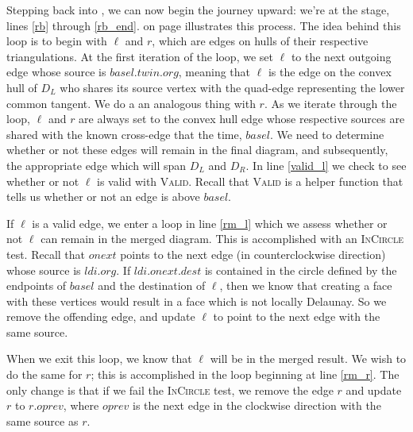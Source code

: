 \documentclass[12pt,twoside]{reedthesis}
\begin{document}
    Stepping back into , we can now begin the journey upward: we're at the  stage, lines \ref{rb} through \ref{rb_end}.  on page \pageref{fig:del_knit_all} illustrates this process. The idea behind this loop is to begin with $\ell$ and $r$, which are edges on hulls of their respective triangulations. At the first iteration of the loop, we set $\ell$ to the next outgoing edge whose source is $basel.twin.org$, meaning that $\ell$ is the edge on the convex hull of $D_{L}$ who shares its source vertex with the quad-edge representing the lower common tangent. We do a an analogous thing with $r$. As we iterate through the loop, $\ell$ and $r$ are always set to the convex hull edge whose respective sources are shared with the  known cross-edge that the time, $basel$. We need to determine whether or not these edges will remain in the final diagram, and subsequently, the appropriate edge which will span $D_{L}$ and $D_{R}$. In line \ref{valid_l} we check to see whether or not $\ell$ is valid with \textsc{Valid}. Recall that \textsc{Valid} is a helper function that tells us whether or not an edge is above $basel$. 

    If $\ell$ is a valid edge, we enter a loop in line \ref{rm_l} which we assess whether or not $\ell$ can remain in the merged diagram. This is accomplished with an \textsc{InCircle} test. Recall that $onext$ points to the next edge (in counterclockwise direction) whose source is $ldi.org$. If $ldi.onext.dest$ is contained in the circle defined by the endpoints of $basel$ and the destination of $\ell$, then we know that creating a face with these vertices would result in a face which is not locally Delaunay. So we remove the offending edge, and update $\ell$ to point to the next edge with the same source.\par

    When we exit this loop, we know that $\ell$ will be in the merged result. We wish to do the same for $r$; this is accomplished in the loop beginning at line \ref{rm_r}. The only change is that if we fail the \textsc{InCircle} test, we remove the edge $r$ and update $r$ to $r.oprev$, where $oprev$ is the next edge in the clockwise direction with the same source as $r$.\par
\end{document}
